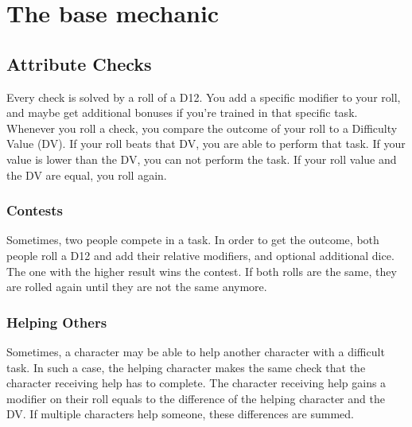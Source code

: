 \chapter{The base mechanic}
\section{Attribute Checks}
Every check is solved by a roll of a D12. You add a specific modifier to your roll, and maybe get additional bonuses if you’re trained in that specific task. Whenever you roll a check, you compare the outcome of your roll to a Difficulty Value (DV). If your roll beats that DV, you are able to perform that task. If your value is lower than the DV, you can not perform the task. If your roll value and the DV are equal, you roll again.

\subsection{Contests}
Sometimes, two people compete in a task. In order to get the outcome, both people roll a D12 and add their relative modifiers, and optional additional dice. The one with the higher result wins the contest. If both rolls are the same, they are rolled again until they are not the same anymore.

\subsection{Helping Others}
Sometimes, a character may be able to help another character with a difficult task. In such a case, the helping character makes the same check that the character receiving help has to complete. The character receiving help gains a modifier on their roll equals to the difference of the helping character and the DV. If multiple characters help someone, these differences are summed.

